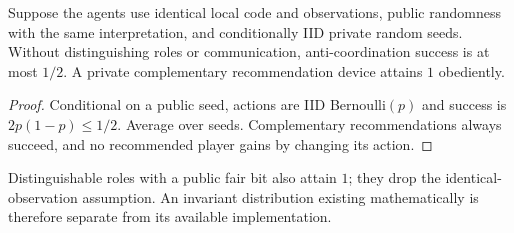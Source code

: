 \begin{proposition}\label{result:03-selection-2}
Suppose the agents use identical local code and observations, public randomness
with the same interpretation, and conditionally IID private random
seeds. Without distinguishing roles or communication, anti-coordination
success is at most $1/2$. A private complementary recommendation device
attains $1$ obediently.
\end{proposition}
\begin{proof}
Conditional on a public seed, actions are IID Bernoulli$(p)$ and success is
$2p(1-p)\le1/2$. Average over seeds. Complementary recommendations always
succeed, and no recommended player gains by changing its action.
\end{proof}
Distinguishable roles with a public fair bit also attain $1$; they drop the
identical-observation assumption. An invariant distribution existing
mathematically is therefore separate from its available implementation.
